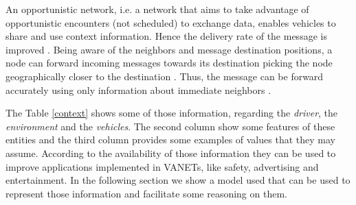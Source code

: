 \documentclass[conference]{IEEEtran}
\begin{document}
An opportunistic network, i.e. a network that aims to take advantage of opportunistic encounters (not scheduled) to exchange data, enables vehicles to share and use context information. Hence the delivery rate of the message is improved \cite{geoopp2014}. Being aware of the neighbors and message destination positions, a node can forward incoming messages towards its destination picking the node geographically closer to the destination \cite{gpsr2000}. Thus, the message can be forward accurately using only information about immediate neighbors \cite{magf2009}. 

The Table \ref{context} shows some of those information, regarding the \emph{driver},  the \emph{environment} and the \emph{vehicles}. The second column show some features of these entities and the third column provides some examples of values that they may assume. According to the availability of those information they can be used to improve applications implemented in VANETs, like safety, advertising and entertainment. In the following section we show a model used that can be used to represent those information and facilitate some reasoning on them.
\end{document}
